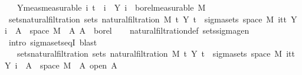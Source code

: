 \begin{isabellebody}
\ \ \ Y{\isacharunderscore}{\kern0pt}meas{\isacharbrackleft}{\kern0pt}measurable{\isacharbrackright}{\kern0pt}{\isacharcolon}{\kern0pt}\ {\isachardoublequoteopen}{\isasymAnd}i{\isachardot}{\kern0pt}\ t\ {\isasymle}\ i\ {\isasymLongrightarrow}\ Y\ i\ {\isasymin}\ borel{\isacharunderscore}{\kern0pt}measurable\ M{\isachardoublequoteclose}\isanewline
{}\isanewline
\isanewline
{}\isamarkupfalse%
\ sets{\isacharunderscore}{\kern0pt}natural{\isacharunderscore}{\kern0pt}filtration{\isacharprime}{\kern0pt}{\isacharcolon}{\kern0pt}\ {\isachardoublequoteopen}sets\ {\isacharparenleft}{\kern0pt}natural{\isacharunderscore}{\kern0pt}filtration\ M\ t\ Y\ t{\isacharparenright}{\kern0pt}\ {\isacharequal}{\kern0pt}\ sigma{\isacharunderscore}{\kern0pt}sets\ {\isacharparenleft}{\kern0pt}space\ M{\isacharparenright}{\kern0pt}\ {\isacharparenleft}{\kern0pt}{\isasymUnion}i{\isasymin}{\isacharbraceleft}{\kern0pt}tt{\isacharbraceright}{\kern0pt}{\isachardot}{\kern0pt}\ {\isacharbraceleft}{\kern0pt}Y\ i\ {\isacharminus}{\kern0pt}{\isacharbackquote}{\kern0pt}\ A\ {\isasyminter}\ space\ M\ {\isacharbar}{\kern0pt}\ A{\isachardot}{\kern0pt}\ A\ {\isasymin}\ borel{\isacharbraceright}{\kern0pt}{\isacharparenright}{\kern0pt}{\isachardoublequoteclose}\isanewline
%
\isadelimproof
\ \ %
\endisadelimproof
%
\isatagproof
{}\isamarkupfalse%
\ natural{\isacharunderscore}{\kern0pt}filtration{\isacharunderscore}{\kern0pt}def\ sets{\isacharunderscore}{\kern0pt}sigma{\isacharunderscore}{\kern0pt}gen\ \isamarkupfalse%
\ {\isacharparenleft}{\kern0pt}intro\ sigma{\isacharunderscore}{\kern0pt}sets{\isacharunderscore}{\kern0pt}eqI{\isacharparenright}{\kern0pt}\ blast{\isacharplus}{\kern0pt}%
\endisatagproof
{\isafoldproof}%
%
\isadelimproof
\isanewline
%
\endisadelimproof
\isanewline
{}\isamarkupfalse%
\isanewline
\ \ \ sets{\isacharunderscore}{\kern0pt}natural{\isacharunderscore}{\kern0pt}filtration{\isacharcolon}{\kern0pt}\ {\isachardoublequoteopen}sets\ {\isacharparenleft}{\kern0pt}natural{\isacharunderscore}{\kern0pt}filtration\ M\ t\ Y\ t{\isacharparenright}{\kern0pt}\ {\isacharequal}{\kern0pt}\ sigma{\isacharunderscore}{\kern0pt}sets\ {\isacharparenleft}{\kern0pt}space\ M{\isacharparenright}{\kern0pt}\ {\isacharparenleft}{\kern0pt}{\isasymUnion}i{\isasymin}{\isacharbraceleft}{\kern0pt}tt{\isacharbraceright}{\kern0pt}{\isachardot}{\kern0pt}\ {\isacharbraceleft}{\kern0pt}Y\ i\ {\isacharminus}{\kern0pt}{\isacharbackquote}{\kern0pt}\ A\ {\isasyminter}\ space\ M\ {\isacharbar}{\kern0pt}\ A{\isachardot}{\kern0pt}\ open\ A{\isacharbraceright}{\kern0pt}{\isacharparenright}{\kern0pt}{\isachardoublequoteclose}\ \isanewline

\end{isabellebody}
